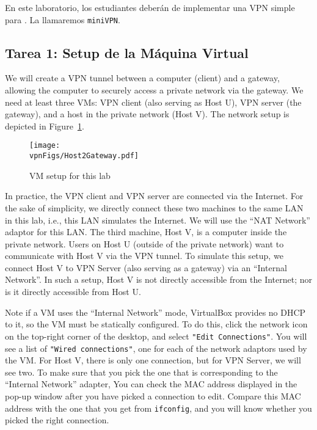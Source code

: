 En este laboratorio, los estudiantes deberán de implementar una VPN simple para \linux. La llamaremos {\tt miniVPN}. 


\subsection{Tarea 1: Setup de la Máquina Virtual}

We will create a VPN tunnel between a 
computer (client) and a gateway, allowing the computer to securely access 
a private network via the gateway. 
We need at least three VMs: VPN client (also serving as Host U), VPN server (the gateway),
and a host in the private network (Host V). 
The network setup is depicted in Figure~\ref{vpn:fig:host2gateway}.


\begin{figure}[htb]
\begin{center}
\texttt{[image: \\vpnFigs/Host2Gateway.pdf]}
\end{center}
\caption{VM setup for this lab}
\label{vpn:fig:host2gateway}
\end{figure}
 


In practice, the VPN client and VPN server are connected via the Internet.
For the sake of simplicity, we directly connect these two
machines to the same LAN in this lab, i.e., this LAN simulates the Internet. 
We will use the ``NAT Network'' adaptor for this LAN.
The third machine, Host V, is a computer inside the private network. Users
on Host U (outside of the private network) want to communicate with Host V
via the VPN tunnel. To simulate this setup, we connect Host V to VPN Server
(also serving as a gateway) via an ``Internal Network''.  In such a setup, 
Host V is not directly accessible from the Internet; nor is it directly accessible 
from Host U. 

Note if a VM uses the ``Internal Network'' mode, VirtualBox provides no DHCP to it, so the
VM must be statically configured. To do this, click the network icon on the top-right corner
of the desktop, and select \texttt{"Edit Connections"}. You will see a list 
of \texttt{"Wired connections"}, one for each of the network adaptors used by the VM. 
For Host V, there is only one connection, but for VPN Server, we will see two. To make sure 
that you pick the one that is corresponding to the ``Internal Network'' adapter, 
You can check the MAC address displayed in the pop-up window after you have 
picked a connection to edit. 
Compare this MAC address with the one that you get from \texttt{ifconfig},
and you will know whether you picked the right connection. 

